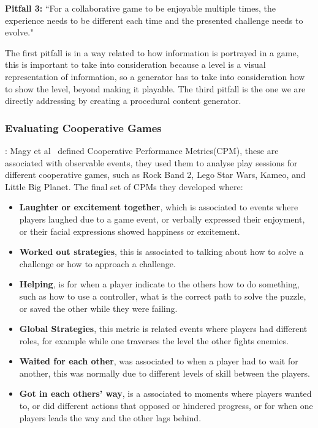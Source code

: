 \documentclass[runningheads]{llncs}
\begin{document}
\textbf{Pitfall 3:} ``For a collaborative game to be enjoyable multiple times, the experience needs to be different each time and the presented challenge needs to evolve."

The first pitfall is in a way related to how information is portrayed in a game, this is important to take into consideration because a level is a visual representation of information, so a generator has to take into consideration how to show the level, beyond making it playable. The third pitfall is the one we are directly addressing by creating a procedural content generator.

\subsubsection{Evaluating Cooperative Games}:
Magy et al~\cite{ref_magy} defined Cooperative Performance Metrics(CPM), these are associated with observable events, they used them to analyse play sessions for different cooperative games, such as Rock Band 2, Lego Star Wars, Kameo, and Little Big Planet. The final set of CPMs they developed where:
\begin{itemize}
    \item\textbf{Laughter or excitement together}, which is associated to events where players laughed due to a game event, or verbally expressed their enjoyment, or their facial expressions showed happiness or excitement.
    
    \item\textbf{Worked out strategies}, this is associated to talking about how to solve a challenge or how to approach a challenge.
    
    \item\textbf{Helping}, is for when a player indicate to the others how to do something, such as how to use a controller, what is the correct path to solve the puzzle, or saved the other while they were failing.
    
    \item\textbf{Global Strategies}, this metric is related events where players had different roles, for example while one traverses the level the other fights enemies.
    
    \item\textbf{Waited for each other}, was associated to when a player had to wait for another, this was normally due to different levels of skill between the players.
    
    \item\textbf{Got in each others’ way}, is a associated to moments where players wanted to, or did different actions that opposed or hindered progress, or for when one players leads the way and the other lags behind.
\end{itemize}
\end{document}
